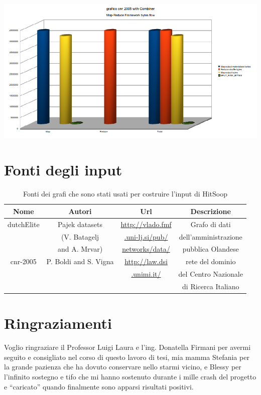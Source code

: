 \documentclass[a4paper,11pt]{report}
\begin{document}
\paragraph{}
\centerline{\includegraphics[width=180mm]{images/grafici/cnrCombMRB.png}}


\chapter{Fonti degli input} \label{Fonti degli input}
\begin{table}
\caption{Fonti dei grafi che sono stati usati per costruire l'input di HitSoop}
\label{tab:fonti}
\begin{tabular}{|c|c|c|c|}
\hline
\hline
Nome & Autori & Url & Descrizione \\
\hline
\hline
dutchElite & Pajek datasets  & \url{http://vlado.fmf} & Grafo di dati \\
 & (V. Batagelj & \url{.uni-lj.si/pub/} & dell'amministrazione \\
 & and A. Mrvar) &\url{networks/data/} & pubblica Olandese \\
\hline
cnr-2005 & P. Boldi and S. Vigna & \url{http://law.dsi} & rete del dominio\\
&&\url{.unimi.it/}& del Centro Nazionale\\
&&& di Ricerca Italiano\\
\hline
\end{tabular}
\end{table}

\chapter*{Ringraziamenti}
Voglio ringraziare il Professor Luigi Laura e l'ing. Donatella Firmani per avermi seguito e consigliato nel corso di questo lavoro di tesi,
mia mamma Stefania per la grande pazienza che ha dovuto
conservare nello starmi vicino, e Blessy per l'infinito sostegno e tifo che mi hanno sostenuto durante i mille crash del progetto e 
``caricato'' quando finalmente sono apparsi risultati positivi.
\end{document}
